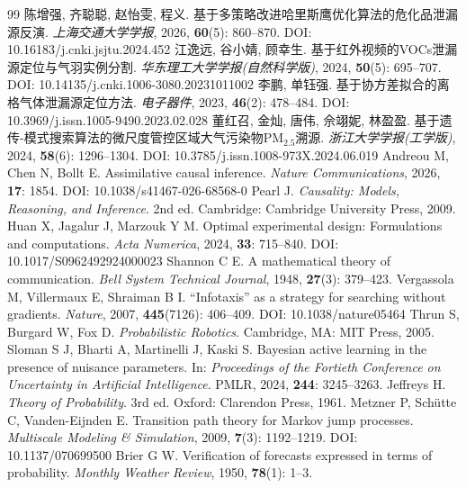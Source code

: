 \documentclass{aas}
\begin{document}
\begin{thebibliography}{99}
 陈增强, 齐聪聪, 赵怡雯, 程义. 基于多策略改进哈里斯鹰优化算法的危化品泄漏源反演. {\sl 上海交通大学学报}, 2026, {\bf 60}(5): 860--870. DOI: 10.16183/j.cnki.jsjtu.2024.452
 江逸远, 谷小婧, 顾幸生. 基于红外视频的VOCs泄漏源定位与气羽实例分割. {\sl 华东理工大学学报(自然科学版)}, 2024, {\bf 50}(5): 695--707. DOI: 10.14135/j.cnki.1006-3080.20231011002
 李鹏, 单钰强. 基于协方差拟合的离格气体泄漏源定位方法. {\sl 电子器件}, 2023, {\bf 46}(2): 478--484. DOI: 10.3969/j.issn.1005-9490.2023.02.028
 董红召, 金灿, 唐伟, 佘翊妮, 林盈盈. 基于遗传-模式搜索算法的微尺度管控区域大气污染物PM$_{2.5}$溯源. {\sl 浙江大学学报(工学版)}, 2024, {\bf 58}(6): 1296--1304. DOI: 10.3785/j.issn.1008-973X.2024.06.019
 Andreou M, Chen N, Bollt E. Assimilative causal inference. {\sl Nature Communications}, 2026, {\bf 17}: 1854. DOI: 10.1038/s41467-026-68568-0
 Pearl J. {\sl Causality: Models, Reasoning, and Inference}. 2nd ed. Cambridge: Cambridge University Press, 2009.
 Huan X, Jagalur J, Marzouk Y M. Optimal experimental design: Formulations and computations. {\sl Acta Numerica}, 2024, {\bf 33}: 715--840. DOI: 10.1017/S0962492924000023
 Shannon C E. A mathematical theory of communication. {\sl Bell System Technical Journal}, 1948, {\bf 27}(3): 379--423.
 Vergassola M, Villermaux E, Shraiman B I. ``Infotaxis'' as a strategy for searching without gradients. {\sl Nature}, 2007, {\bf 445}(7126): 406--409. DOI: 10.1038/nature05464
 Thrun S, Burgard W, Fox D. {\sl Probabilistic Robotics}. Cambridge, MA: MIT Press, 2005.
 Sloman S J, Bharti A, Martinelli J, Kaski S. Bayesian active learning in the presence of nuisance parameters. In: {\sl Proceedings of the Fortieth Conference on Uncertainty in Artificial Intelligence}. PMLR, 2024, {\bf 244}: 3245--3263.
 Jeffreys H. {\sl Theory of Probability}. 3rd ed. Oxford: Clarendon Press, 1961.
 Metzner P, Schütte C, Vanden-Eijnden E. Transition path theory for Markov jump processes. {\sl Multiscale Modeling \& Simulation}, 2009, {\bf 7}(3): 1192--1219. DOI: 10.1137/070699500
 Brier G W. Verification of forecasts expressed in terms of probability. {\sl Monthly Weather Review}, 1950, {\bf 78}(1): 1--3.
\end{thebibliography}
\end{document}
